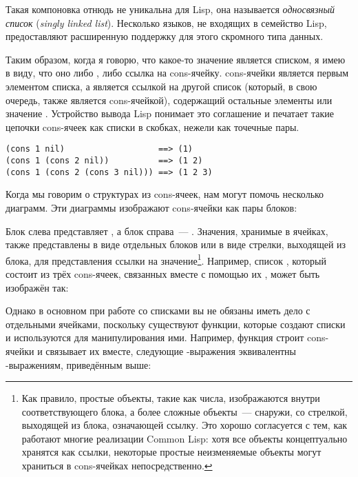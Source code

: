 Такая компоновка отнюдь не уникальна для Lisp, она называется \textit{односвязный
список} (\textit{singly linked list}). Несколько языков, не входящих в семейство Lisp,
предоставляют расширенную поддержку для этого скромного типа данных.

Таким образом, когда я говорю, что какое-то значение является списком, я имею в виду, что
оно либо , либо ссылка на cons-ячейку.  cons-ячейки является первым
элементом списка, а  является ссылкой на другой список (который, в свою очередь,
также является cons-ячейкой), содержащий остальные элементы или значение
. Устройство вывода Lisp понимает это соглашение и печатает такие цепочки
cons-ячеек как списки в скобках, нежели как точечные пары.

\begin{lstlisting}
(cons 1 nil)                   ==> (1)
(cons 1 (cons 2 nil))          ==> (1 2)
(cons 1 (cons 2 (cons 3 nil))) ==> (1 2 3)
\end{lstlisting}

Когда мы говорим о структурах из cons-ячеек, нам могут помочь несколько диаграмм. Эти
диаграммы изображают cons-ячейки как пары блоков:


Блок слева представляет , а блок справа~--- . Значения, хранимые в
ячейках, также представлены в виде отдельных блоков или в виде стрелки, выходящей из блока,
для представления ссылки на значение\footnote{Как правило, простые объекты, такие как
  числа, изображаются внутри соответствующего блока, а более сложные объекты~--- снаружи, со
  стрелкой, выходящей из блока, означающей ссылку. Это хорошо согласуется с тем, как
  работают многие реализации Common Lisp: хотя все объекты концептуально хранятся как
  ссылки, некоторые простые неизменяемые объекты могут храниться в cons-ячейках
  непосредственно.}. Например, список , который состоит из трёх cons-ячеек,
связанных вместе с помощью их , может быть изображён так:


Однако в основном при работе со списками вы не обязаны иметь дело с отдельными ячейками,
поскольку существуют функции, которые создают списки и используются для манипулирования
ими. Например, функция  строит cons-ячейки и связывает их вместе, следующие
-выражения эквивалентны -выражениям, приведённым выше:

